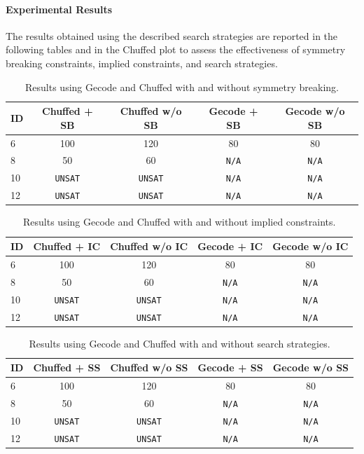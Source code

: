 \documentclass[11pt]{article}
\begin{document}
\begin{itemize}
\paragraph{Experimental Results}

The results obtained using the described search strategies are reported in the following tables and in the Chuffed plot to assess the effectiveness of symmetry breaking constraints, implied constraints, and search strategies.

\begin{table}[H]
\centering
\label{tab:symm}
\begin{tabular}{@{}lcccc@{}}
\toprule
\textbf{ID} & \textbf{Chuffed + SB} & \textbf{Chuffed w/o SB} & \textbf{Gecode + SB} & \textbf{Gecode w/o SB} \\
\midrule
6 & 100 & 120 & 80 & 80 \\
8 & 50 & 60 & \texttt{N/A} & \texttt{N/A} \\
10 & \texttt{UNSAT} & \texttt{UNSAT} & \texttt{N/A} & \texttt{N/A} \\
12 & \texttt{UNSAT} & \texttt{UNSAT} & \texttt{N/A} & \texttt{N/A} \\
\bottomrule
\end{tabular}
\caption{Results using Gecode and Chuffed with and without symmetry breaking.}
\end{table}

\begin{table}[H]
\centering
\label{tab:implied}
\begin{tabular}{@{}lcccc@{}}
\toprule
\textbf{ID} & \textbf{Chuffed + IC} & \textbf{Chuffed w/o IC} & \textbf{Gecode + IC} & \textbf{Gecode w/o IC} \\
\midrule
6 & 100 & 120 & 80 & 80 \\
8 & 50 & 60 & \texttt{N/A} & \texttt{N/A} \\
10 & \texttt{UNSAT} & \texttt{UNSAT} & \texttt{N/A} & \texttt{N/A} \\
12 & \texttt{UNSAT} & \texttt{UNSAT} & \texttt{N/A} & \texttt{N/A} \\
\bottomrule
\end{tabular}
\caption{Results using Gecode and Chuffed with and without implied constraints.}
\end{table}

\begin{table}[H]
\centering
\label{tab:search}
\begin{tabular}{@{}lcccc@{}}
\toprule
\textbf{ID} & \textbf{Chuffed + SS} & \textbf{Chuffed w/o SS} & \textbf{Gecode + SS} & \textbf{Gecode w/o SS} \\
\midrule
6 & 100 & 120 & 80 & 80 \\
8 & 50 & 60 & \texttt{N/A} & \texttt{N/A} \\
10 & \texttt{UNSAT} & \texttt{UNSAT} & \texttt{N/A} & \texttt{N/A} \\
12 & \texttt{UNSAT} & \texttt{UNSAT} & \texttt{N/A} & \texttt{N/A} \\
\bottomrule
\end{tabular}
\caption{Results using Gecode and Chuffed with and without search strategies.}
\end{table}


\end{itemize}
\end{document}
